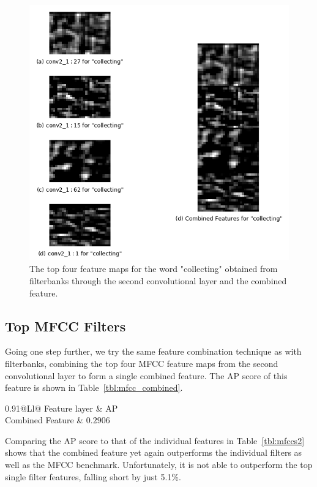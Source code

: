 \begin{figure}[ht]
    \centering
    \includegraphics[width=0.5\linewidth]{content/fig/fbankCombined.png}
    \caption{The top four feature maps for the word "collecting" obtained from filterbanks through the second convolutional layer and the combined feature.}
    \label{fig:fbank_combined}
\end{figure}

\subsection{Top MFCC Filters}

Going one step further, we try the same feature combination technique as with filterbanks, combining the top four MFCC feature maps from the second convolutional layer to form a single combined feature.
The AP score of this feature is shown in Table~\ref{tbl:mfcc_combined}.

\begin{table}[!ht]
    \mytable
    \caption{AP score for for the combined feature from the top four features obtained by passing the MFCC through layer $\mathtt{conv2}$.}
    \begin{tabularx}{0.91\linewidth}{@{}Ll@{}}
        \toprule
        Feature layer          & AP       \\
        \midrule
        Combined Feature    & $0.2906$ \\
        \bottomrule
    \end{tabularx}
    \label{tbl:mfcc_combined}
\end{table}

Comparing the AP score to that of the individual features in Table~\ref{tbl:mfccs2} shows that the combined feature yet again outperforms the individual filters as well as the MFCC benchmark.
Unfortunately, it is not able to outperform the top single filter features, falling short by just 5.1\%.

